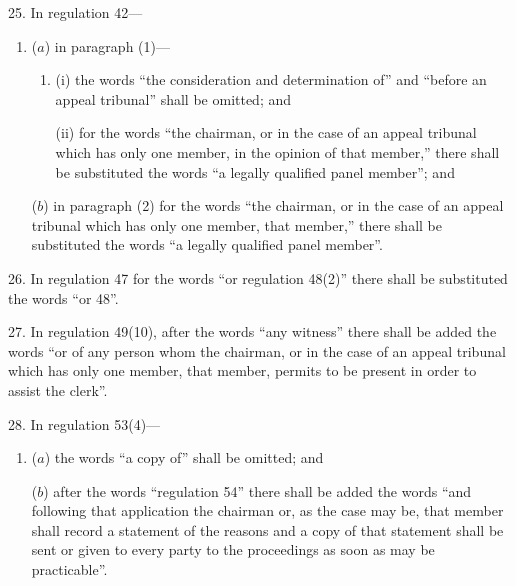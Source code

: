 \documentclass[12pt,a4paper]{article}
\begin{document}
25.  In regulation 42—
\begin{enumerate}\item[]
($a$) in paragraph (1)—
\begin{enumerate}\item[]
(i) the words “the consideration and determination of” and “before an appeal tribunal” shall be omitted; and

(ii) for the words “the chairman, or in the case of an appeal tribunal which has only one member, in the opinion of that member,” there shall be substituted the words “a legally qualified panel member”; and
\end{enumerate}

($b$) in paragraph (2) for the words “the chairman, or in the case of an appeal tribunal which has only one member, that member,” there shall be substituted the words “a legally qualified panel member”.
\end{enumerate}

\medskip

26.  In regulation 47 for the words “or regulation 48(2)” there shall be substituted the words “or 48”.

\medskip

27.  In regulation 49(10), after the words “any witness” there shall be added the words “or of any person whom the chairman, or in the case of an appeal tribunal which has only one member, that member, permits to be present in order to assist the clerk”.

\medskip

28.  In regulation 53(4)—
\begin{enumerate}\item[]
($a$) the words “a copy of” shall be omitted; and

($b$) after the words “regulation 54” there shall be added the words “and following that application the chairman or, as the case may be, that member shall record a statement of the reasons and a copy of that statement shall be sent or given to every party to the proceedings as soon as may be practicable”.
\end{enumerate}

\medskip
\end{document}
